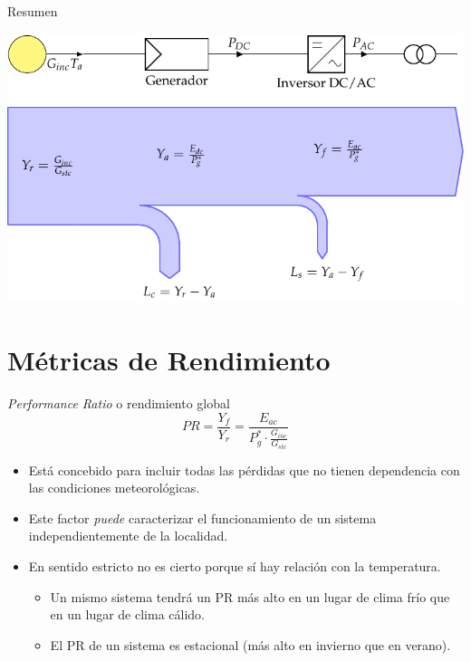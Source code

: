 \documentclass[aspectratio=169, usenames,svgnames,dvipsnames]{beamer}
\begin{document}
\begin{frame}[label={sec:org4644070}]{Resumen}
\begin{center}
\includegraphics[height=0.9\textheight]{../figs/SankeyDiagrama_SFCR.pdf}
\end{center}
\end{frame}

\section{Métricas de Rendimiento}
\label{sec:org55f87be}

\begin{frame}[label={sec:orgb73023e}]{\emph{Performance Ratio} o rendimiento global}
\[
  PR = \frac{Y_f}{Y_r} = \frac{E_{ac}}{P_g^* \cdot \frac{G_{inc}}{G_{stc}}}
\]

\begin{itemize}
\item Está concebido para incluir todas las \alert{pérdidas que no tienen
dependencia con las condiciones meteorológicas}.

\item Este factor \emph{puede} caracterizar el funcionamiento de un sistema
\alert{independientemente de la localidad}.

\item En sentido estricto no es cierto porque sí hay \alert{relación con la temperatura}.

\begin{itemize}
\item Un mismo sistema tendrá un PR más alto en un lugar de clima frío que en un lugar de clima cálido.

\item El PR de un sistema es estacional (más alto en invierno que en verano).
\end{itemize}
\end{itemize}
\end{frame}
\end{document}
